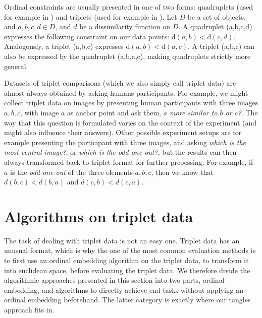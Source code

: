 Ordinal constraints are usually presented in one of two forms: quadruplets (used for example in \cite{ghoshdastidarFoundationsComparisonBasedHierarchical2019}) and triplets (used for example in \cite{vankadaraInsightsOrdinalEmbedding2021,haghiriComparisonBasedFrameworkPsychophysics2019}).
Let $D$ be a set of objects, and $a,b,c,d \in D$, and $d$ be a dissimilarity function on $D$.
A quadruplet (a,b,c,d) expresses the following constraint on our data points: $\text{d}(a,b) < \text{d}(c,d)$. 
Analogously, a triplet (a,b,c) expresses $\text{d}(a,b) < \text{d}(a,c)$. 
A triplet (a,b,c) can also be expressed by the quadruplet (a,b,a,c), making quadruplets strictly more general. 

Datasets of triplet comparisons (which we also simply call triplet data) are almost always obtained by asking humans participants. For example, we might 
collect triplet data on images by presenting human participants with three images $a,b,c$, 
with image $a$ as anchor point and ask them, \textit{$a$ more similar to $b$ or $c$?}.
The way that this question is formulated varies on the context of the experiment (and might also influence their answers). 
Other possible experiment setups are for example presenting the participant with three images, and asking \textit{which is the most central image?}, or \textit{which is the odd one out?},
but the results can then always transformed back to triplet format for further prcoessing. 
For example, if $a$ is the \textit{odd-one-out} of the three elements $a,b,c$, 
then we know that $d(b,c) < d(b,a)$ and $d(c, b) < d(c,a)$. 

\section{Algorithms on triplet data}
The task of dealing with triplet data is not an easy one. %
Triplet data has an unusual format, which is why the one of the most common evaluation
methods is to first use an ordinal embedding algorithm on the triplet data, to transform it into
euclidean space, before evaluating the triplet data. We therefore divide the algorithmic approaches presented in this section into two parts, ordinal embedding, and algorithms to directly achieve
end tasks without applying an ordinal embedding beforehand. The latter category is exactly
where our tangles approach fits in.

